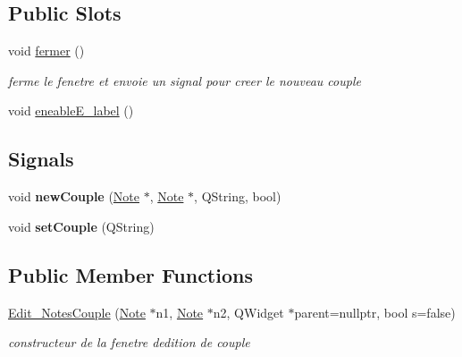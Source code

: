 \subsection*{Public Slots}
\begin{DoxyCompactItemize}
\item 
\mbox{\label{class_edit___notes_couple_a1395f82d63778d45d927620e8c453d52}} 
void \hyperlink{class_edit___notes_couple_a1395f82d63778d45d927620e8c453d52}{fermer} ()
\begin{DoxyCompactList}\small\item\em ferme le fenetre et envoie un signal pour creer le nouveau couple \end{DoxyCompactList}\item 
void \hyperlink{class_edit___notes_couple_ad51b47f9284bea44cddc186674c57bc9}{eneable\+E\+\_\+label} ()
\end{DoxyCompactItemize}
\subsection*{Signals}
\begin{DoxyCompactItemize}
\item 
\mbox{\label{class_edit___notes_couple_a4cf6489e93bef94d95fe460b195ba13d}} 
void {\bfseries new\+Couple} (\hyperlink{class_note}{Note} $\ast$, \hyperlink{class_note}{Note} $\ast$, Q\+String, bool)
\item 
\mbox{\label{class_edit___notes_couple_af5c4267cc253eb46628a89e2f14dadf6}} 
void {\bfseries set\+Couple} (Q\+String)
\end{DoxyCompactItemize}
\subsection*{Public Member Functions}
\begin{DoxyCompactItemize}
\item 
\hyperlink{class_edit___notes_couple_aa0780f3a53175747c5a7136d4f2ffa30}{Edit\+\_\+\+Notes\+Couple} (\hyperlink{class_note}{Note} $\ast$n1, \hyperlink{class_note}{Note} $\ast$n2, Q\+Widget $\ast$parent=nullptr, bool s=false)
\begin{DoxyCompactList}\small\item\em constructeur de la fenetre d\textquotesingle{}edition de couple \end{DoxyCompactList}\end{DoxyCompactItemize}


